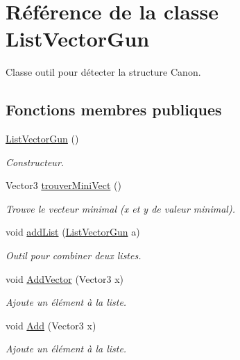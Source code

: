 \hypertarget{class_list_vector_gun}{}\section{Référence de la classe List\+Vector\+Gun}
\label{class_list_vector_gun}


Classe outil pour détecter la structure Canon.  


\subsection*{Fonctions membres publiques}
\begin{DoxyCompactItemize}
\item 
\mbox{\hyperlink{class_list_vector_gun_a9f370c4f677db9d3ecb750febcaed21e}{List\+Vector\+Gun}} ()
\begin{DoxyCompactList}\small\item\em Constructeur. \end{DoxyCompactList}\item 
Vector3 \mbox{\hyperlink{class_list_vector_gun_a305381e8b2d20184c1894c89d2726b2c}{trouver\+Mini\+Vect}} ()
\begin{DoxyCompactList}\small\item\em Trouve le vecteur minimal (x et y de valeur minimal). \end{DoxyCompactList}\item 
void \mbox{\hyperlink{class_list_vector_gun_ae32fc88f0d58affa06527f97a19f1f70}{add\+List}} (\mbox{\hyperlink{class_list_vector_gun}{List\+Vector\+Gun}} a)
\begin{DoxyCompactList}\small\item\em Outil pour combiner deux listes. \end{DoxyCompactList}\item 
void \mbox{\hyperlink{class_list_vector_gun_a9dc269fd17f18f6c9f4e974990c6e442}{Add\+Vector}} (Vector3 x)
\begin{DoxyCompactList}\small\item\em Ajoute un élément à la liste. \end{DoxyCompactList}\item 
void \mbox{\hyperlink{class_list_vector_gun_a2969c469590b46d382af86ffbffe46c4}{Add}} (Vector3 x)
\begin{DoxyCompactList}\small\item\em Ajoute un élément à la liste. \end{DoxyCompactList}\item 

\end{DoxyCompactItemize}
